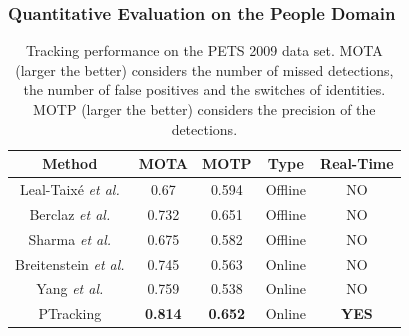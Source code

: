 \begin{frame}
	\frametitle{Quantitative Evaluation on the People Domain}
	
	\begin{table}[!t]
		\renewcommand{\arraystretch}{1.3}
		\caption{Tracking performance on the PETS 2009 data set. MOTA (larger the better)
				 considers the number of missed detections, the number of false positives
				 and the switches of identities. MOTP (larger the better) considers the
				 precision of the detections.}
		\centering
		\vspace{0.2cm}
		
		\begin{tabular}{ccccc}
			\hline
			\hline
			\textbf{Method} & \textbf{MOTA} & \textbf{MOTP} & \textbf{Type} & \textbf{Real-Time} \\
			\hline
			Leal-Taix\'{e} \emph{et al.} \cite{Leal11} & 0.67 & 0.594 & Offline & NO \\
			\hline
			Berclaz \emph{et al.} \cite{Berclaz11} & 0.732 & 0.651 & Offline & NO \\
			\hline
			Sharma \emph{et al.} \cite{Sharma09} & 0.675 & 0.582 & Offline & NO \\
			\hline
			Breitenstein \emph{et al.} \cite{Berclaz11} & 0.745 & 0.563 & Online & NO \\
			\hline
			Yang \emph{et al.} \cite{Yang09} & 0.759 & 0.538 & Online & NO \\
			\hline
			PTracking & \textbf{0.814} & \textbf{0.652} & Online & \textbf{YES} \\
			\hline
		\hline
		\end{tabular}
	\end{table}
\end{frame}

